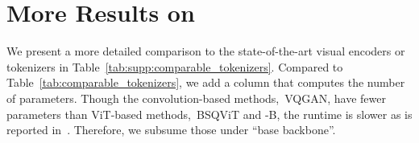 \begin{table}[!tb]
    \centering
    \caption{\textbf{Hyperparamters for training \ourlm.}}
    \label{tab:supp:hyperparam:um3}
\end{table}


\section{More Results on \ours}
We present a more detailed comparison to the state-of-the-art visual encoders or tokenizers in Table~\ref{tab:supp:comparable_tokenizers}.
Compared to Table~\ref{tab:comparable_tokenizers}, we add a column that computes the number of parameters.
Though the convolution-based methods,~\eg VQGAN, have fewer parameters than ViT-based methods,~\eg BSQViT and \ours-B, the runtime is slower as is reported in~\cite{zhao2024bsq}.
Therefore, we subsume those under ``base backbone''.

